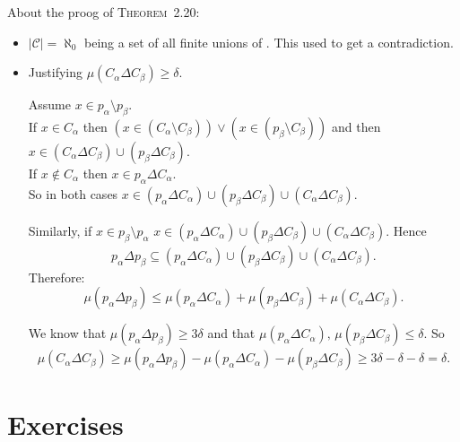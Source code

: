 About the proog of \textsc{Theorem}~2.20:
\begin{itemize}
\item \(|\mathscr{C}|=\aleph_0\) being a set of all finite unions of \scrB.
  This used to get a contradiction.
\item Justifying \(\mu(C_\alpha \Delta C_\beta) \geq \delta\).

  Assume \(x\in p_\alpha \setminus p_\beta\).\\
  If \(x\in C_\alpha\) then 
  \((x \in (C_\alpha \setminus C_\beta))\lor(x\in (p_\beta \setminus C_\beta))\)
  and then \(x\in (C_\alpha \Delta C_\beta) \cup (p_\beta \Delta C_\beta)\).
  \\
  If \(x\notin C_\alpha\) then \(x \in p_\alpha \Delta C_\alpha\).\\
  So in both cases 
    \(x \in (p_\alpha \Delta C_\alpha) \cup (p_\beta \Delta C_\beta) 
      \cup  (C_\alpha \Delta C_\beta)\).

  Similarly, if \(x\in p_\beta \setminus p_\alpha\)
    \(x \in (p_\alpha \Delta C_\alpha) \cup (p_\beta \Delta C_\beta) 
      \cup  (C_\alpha \Delta C_\beta)\). Hence
  \begin{equation*}
    p_\alpha \Delta p_\beta \subseteq
    (p_\alpha \Delta C_\alpha) \cup (p_\beta \Delta C_\beta) 
      \cup  (C_\alpha \Delta C_\beta).
  \end{equation*}
  Therefore:
  \begin{equation*}
    \mu(p_\alpha \Delta p_\beta) \leq
    \mu(p_\alpha \Delta C_\alpha) + \mu(p_\beta \Delta C_\beta) 
      + \mu(C_\alpha \Delta C_\beta).
  \end{equation*}

  We know that \(\mu(p_\alpha \Delta p_\beta) \geq 3\delta\)
  and that 
  \(\mu(p_\alpha \Delta C_\alpha),\,\mu(p_\beta \Delta C_\beta) \leq \delta\).
  So
  \begin{equation*}
  \mu(C_\alpha \Delta C_\beta) \geq
    \mu(p_\alpha \Delta p_\beta)
      - \mu(p_\alpha \Delta C_\alpha) - \mu(p_\beta \Delta C_\beta) 
  \geq 3\delta - \delta - \delta = \delta.
  \end{equation*}


\end{itemize}

\section{Exercises}

